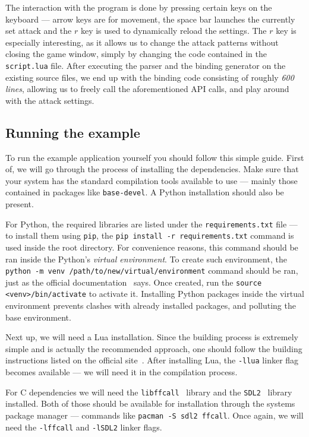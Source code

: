 \documentclass[polish, english]{iithesis}
\begin{document}
    The interaction with the program is done by pressing certain keys on the keyboard --- arrow keys are for movement, the space bar launches the currently set attack and the $r$ key is used to dynamically reload the settings.
    The $r$ key is especially interesting, as it allows us to change the attack patterns without closing the game window, simply by changing the code contained in the \texttt{script.lua} file.
    After executing the parser and the binding generator on the existing source files, we end up with the binding code consisting of roughly \textit{600 lines}, allowing us to freely call the aforementioned API calls, and play around with the attack settings.

    \subsection{Running the example}
      To run the example application yourself you should follow this simple guide.
      First of, we will go through the process of installing the dependencies.
      Make sure that your system has the standard compilation tools available to use --- mainly those contained in packages like \texttt{base-devel}.
      A Python installation should also be present.

      For Python, the required libraries are listed under the \texttt{requirements.txt} file --- to install them using \texttt{pip}, the \texttt{pip install -r requirements.txt} command is used inside the root directory.
      For convenience reasons, this command should be ran inside the Python's \textit{virtual environment}.
      To create such environment, the \texttt{python -m venv /path/to/new/virtual/environment} command should be ran, just as the official documentation~\cite{venv} says.
      Once created, run the \texttt{source <venv>/bin/activate} to activate it.
      Installing Python packages inside the virtual environment prevents clashes with already installed packages, and polluting the base environment.

      Next up, we will need a Lua installation.
      Since the building process is extremely simple and is actually the recommended approach, one should follow the building instructions listed on the official site~\cite{lua-web}.
      After installing Lua, the \texttt{-llua} linker flag becomes available --- we will need it in the compilation process.

      For C dependencies we will need the \texttt{libffcall}~\cite{ffcall} library and the \texttt{SDL2}~\cite{sdl2} library installed.
      Both of those should be available for installation through the systems package manager --- commands like \texttt{pacman -S sdl2 ffcall}.
      Once again, we will need the \texttt{-lffcall} and \texttt{-lSDL2} linker flags.
      
\end{document}
